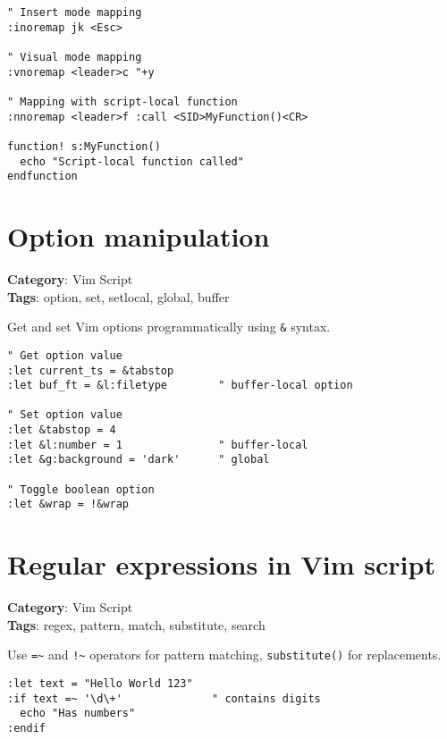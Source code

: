 {{{{{{{{{{{{{{{{{{\begin{Exa*}{}
\begin{Verbatim}[fontsize=\footnotesize, breaklines, breakanywhere]
" Insert mode mapping
:inoremap jk <Esc>

" Visual mode mapping
:vnoremap <leader>c "+y

" Mapping with script-local function
:nnoremap <leader>f :call <SID>MyFunction()<CR>

function! s:MyFunction()
  echo "Script-local function called"
endfunction
\end{Verbatim}
\end{Exa*}

\section{Option manipulation}

\textbf{Category}: Vim Script\\ \textbf{Tags}: option, set, setlocal, global, buffer
\vspace{0.5cm}

Get and set Vim options programmatically using {\footnotesize \Verb§&§} syntax.

\begin{Exa*}{}
\begin{Verbatim}[fontsize=\footnotesize, breaklines, breakanywhere]
" Get option value
:let current_ts = &tabstop
:let buf_ft = &l:filetype        " buffer-local option

" Set option value
:let &tabstop = 4
:let &l:number = 1               " buffer-local
:let &g:background = 'dark'      " global

" Toggle boolean option
:let &wrap = !&wrap
\end{Verbatim}
\end{Exa*}

\section{Regular expressions in Vim script}

\textbf{Category}: Vim Script\\ \textbf{Tags}: regex, pattern, match, substitute, search
\vspace{0.5cm}

Use {\footnotesize \Verb§=~§} and {\footnotesize \Verb§!~§} operators for pattern matching, {\footnotesize \Verb§substitute()§} for replacements.

\begin{Exa*}{}
\begin{Verbatim}[fontsize=\footnotesize, breaklines, breakanywhere]
:let text = "Hello World 123"
:if text =~ '\d\+'              " contains digits
  echo "Has numbers"
:endif


\end{Verbatim}
\end{Exa*}}}}}}}}}}}}}}}}}}}
